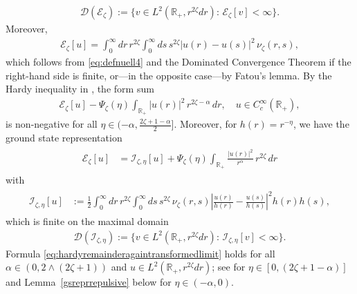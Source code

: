 \documentclass[12pt,reqno]{amsart}
\theoremstyle{definition}
\theoremstyle{remark}
\numberwithin{equation}{section}
\newcommand{\1}{\mathbbm{1}}
\newcommand{\D}{\mathcal{D}}
\newcommand{\R}{\mathbb{R}}
\def\ce{\mathcal{E}}
\def\ci{\mathcal{I}}
\begin{document}
\begin{align}
  \label{eq:maximaldomainezeta}
  \D(\ce_\zeta) := \{v\in L^2(\R_+,r^{2\zeta}dr):\,\ce_\zeta[v]<\infty\}.
\end{align}
Moreover,
\begin{align}
  \label{eq:ezetalimit}
  \ce_\zeta[u] = \int_0^\infty dr\, r^{2\zeta} \int_0^\infty ds\, s^{2\zeta} |u(r)-u(s)|^2\,\nu_{\zeta}(r,s),
\end{align}
which follows from \eqref{eq:defnuell4} and the Dominated Convergence Theorem if the right-hand side is finite, or---in the opposite case---by Fatou's lemma.
%
By the Hardy inequality in \cite{BogdanMerz2024}, the form sum
\begin{align}
  \ce_\zeta[u] - \Psi_\zeta(\eta)\int_{\R_+}|u(r)|^2\, r^{2\zeta-\alpha}\,dr,
  \quad u\in C_c^\infty(\R_+),
\end{align}
is non-negative for all $\eta\in(-\alpha,\frac{2\zeta+1-\alpha}{2}]$. Moreover, for $h(r)=r^{-\eta}$, we have the ground state representation
\begin{align}
  \label{eq:hardyremainderagaintransformedlimit}
  \begin{split}
    \ce_\zeta[u]
    & = \ci_{\zeta,\eta}[u] + \Psi_\zeta(\eta)\int_{\R_+} \frac{|u(r)|^2}{r^\alpha}\,r^{2\zeta}\,dr
  \end{split}
\end{align}
with 
\begin{align}
  \label{eq:defizetaeta}
  \begin{split}
    \ci_{\zeta,\eta}[u]
    & := \frac12\int_0^\infty dr\, r^{2\zeta}\int_0^\infty ds\, s^{2\zeta}\, \nu_{\zeta}(r,s) \left|\frac{u(r)}{h(r)} - \frac{u(s)}{h(s)}\right|^2 h(r) h(s),
  \end{split}
\end{align}\index{$\ci_{\zeta,\eta}$}
which is finite on the maximal domain
\begin{align}
  \D(\ci_{\zeta,\eta}) := \{v\in L^2(\R_+,r^{2\zeta}dr):\,\ci_{\zeta,\eta}[v]<\infty\}.
\end{align}
Formula \eqref{eq:hardyremainderagaintransformedlimit} holds for all $\alpha\in(0,2\wedge(2\zeta+1))$ and $u\in L^2(\R_+,r^{2\zeta}dr)$; see \cite[Theorem~3.2]{BogdanMerz2024} for $\eta\in[0,(2\zeta+1-\alpha)]$ and Lemma~\ref{gsreprrepulsive} below for $\eta\in(-\alpha,0)$.
\end{document}
